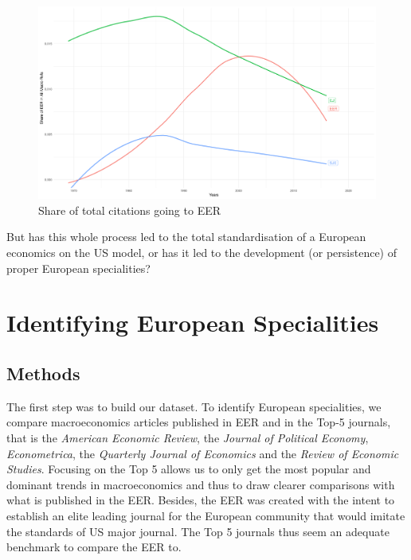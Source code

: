 \documentclass[]{elsarticle} %
\begin{document}
\begin{figure}[h]

{\centering \includegraphics[width=1\linewidth]{EER_Importance} 

}

\caption{Share of total citations going to EER}\label{fig:plot-eer-importance}
\end{figure}

But has this whole process led to the total standardisation of a
European economics on the US model, or has it led to the development (or
persistence) of proper European specialities?

\hypertarget{european-specialities}{%
\section{Identifying European
Specialities}\label{european-specialities}}

\hypertarget{methods}{%
\subsection{Methods}\label{methods}}

The first step was to build our dataset. To identify European
specialities, we compare macroeconomics articles published in EER and in
the Top-5 journals, that is the \emph{American Economic Review}, the
\emph{Journal of Political Economy}, \emph{Econometrica}, the
\emph{Quarterly Journal of Economics} and the \emph{Review of Economic
Studies}. Focusing on the Top 5 allows us to only get the most popular
and dominant trends in macroeconomics and thus to draw clearer
comparisons with what is published in the EER. Besides, the EER was
created with the intent to establish an elite leading journal for the
European community that would imitate the standards of US major journal.
The Top 5 journals thus seem an adequate benchmark to compare the EER
to.
\end{document}
